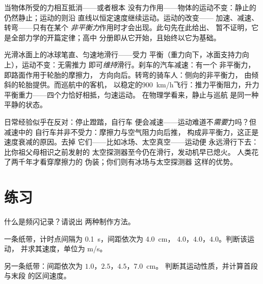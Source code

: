 \begin{proposition}[平衡的力不改变运动]\label{prop:g9:uniform-varied-motion:inertia}
当物体所受的力相互抵消——或者根本
没有力作用——物体的运动不变：静止的
仍然静止；运动的则沿
直线以恒定速度继续运动。运动的改变——
加速、减速、转弯——只有在某个
\emph{非平衡力}作用时才会出现。此句先在此给出、
暂不证明，它是全部力学的开篇定律；高中
分册即从它开始，且始终以它为基础。
\end{proposition}

\begin{example}[用这句话读懂世界]\label{ex:g9:uniform-varied-motion:reading}
光滑冰面上的冰球笔直、匀速地滑行——受力
平衡（重力向下，冰面支持力向上），运动不变：无需推力
即可\emph{维持}滑行。刹车的汽车减速：有一个
非平衡力，即路面作用于轮胎的摩擦力，
方向向后。转弯的骑车人：侧向的非平衡力，
由倾斜的轮胎提供。而巡航中的客机，
以稳定的\qty{900}{km/h}飞行：推力平衡阻力，升力
平衡重力——四个力恰好相抵，匀速运动。
在物理学看来，静止与巡航
是同一种平静的状态。
\end{example}

\begin{remark}[这句话为何令人惊讶]\label{rem:g9:uniform-varied-motion:surprise}
日常经验似乎在反对：停止蹬踏，自行车
便会减速——运动难道不\emph{需要}力吗？但减速中的
自行车并非不受力：摩擦力与空气阻力向后推，
构成非平衡力，这正是速度衰减的原因。去掉
它们——比如冰场、太空真空——运动便
永远滑行下去：比你祖父母相识之前发射的
太空探测器至今仍在滑行，发动机早已熄火。
人类花了两千年才看穿摩擦力的
伪装；你们则有冰场与太空探测器
这样的优势。
\end{remark}

\section{练习}

\begin{exercise}[$\star$]\label{exo:g9:uniform-varied-motion:1}
什么是频闪记录？请说出
两种制作方法。
\end{exercise}

\begin{exercise}[$\star$]\label{exo:g9:uniform-varied-motion:2}
一条纸带，计时点间隔为 \qty{0.1}{s}，间距依次为 \qty{4.0}{cm}，
$4.0$，$4.0$，$4.0$。判断该运动，
并求其速度，单位为 \unit{m/s}。
\end{exercise}

\begin{exercise}[$\star$]\label{exo:g9:uniform-varied-motion:3}
另一条纸带：间距依次为 $1.0$，$2.5$，$4.5$，\qty{7.0}{cm}。
判断其运动性质，并计算首段与末段
的区间速度。
\end{exercise}

